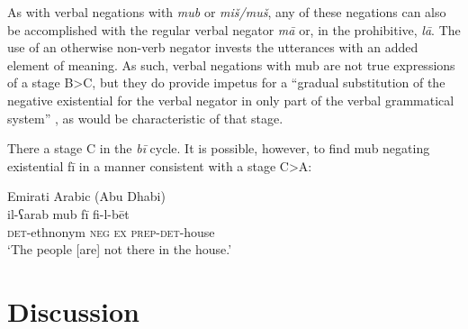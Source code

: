 \documentclass[output=paper]{langsci/langscibook}
\begin{document}
As with verbal negations with \textit{mub} or \textit{miš/muš}, any of these negations can also be accomplished with the regular verbal negator \textit{mā} or, in the prohibitive, \textit{lā}. The use of an otherwise non-verb negator invests the utterances with an added element of meaning. As such, verbal negations with mub are not true expressions of a stage B>C, but they do provide impetus for a “gradual substitution of the negative existential for the verbal negator in only part of the verbal grammatical system” \citep[10]{Croft1991}, as would be characteristic of that stage.

There a stage C in the \textit{bī} cycle. It is possible, however, to find mub negating existential fī in a manner consistent with a stage C>A:

\ea Emirati Arabic (Abu Dhabi)\label{ex:WiAR-35}\\
	\gll il-ʕarab mub fī fi-l-bēt\\
	\textsc{det}-ethnonym \textsc{neg} \textsc{ex} \textsc{prep-det}-house\\
	\glt ‘The people [are] not there in the house.’ \citep[121]{al-rawi1990a}
\z

\section{Discussion} \label{s:WiAR-5}
\end{document}

